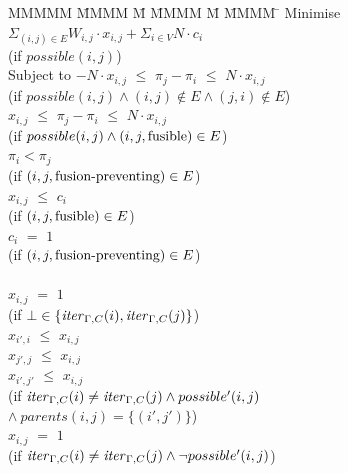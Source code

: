 \begin{tabbing}
MMMMM   \= MMMM \= M \= MMMM \= M \= MMMM \= \kill
Minimise   \> $\Sigma_{(i,j) \in E} W_{i,j} \cdot x_{i,j} + \Sigma_{i \in V} N \cdot c_i$  \\
           \> (if $possible(i,j)$)         
\\[1ex]
Subject to \> $-N \cdot x_{i,j}$ \> $\le$ \> $\pi_j - \pi_i$ \> $\le$ \> $N \cdot x_{i,j}$ \\
           \> (if $possible(i,j) \wedge (i,j) \not\in E \wedge (j,i) \not\in E$)            
\\[1ex]
           \>    $x_{i,j}$ \> $\le$ \> $\pi_j - \pi_i$ \> $\le$ \> $N \cdot x_{i,j}$ \\
           \> (if $possible(i,j) \wedge (i,j,\mathrm{fusible}) \in E$)     
\\[1ex]
           \>             \>       \> $\pi_i < \pi_j$ \>       \>            \\
           \> (if $(i,j,\mbox{fusion-preventing}) \in E$)    
\\[1ex]
           \> $x_{i,j}$    \> $\le$ \> $c_i$           \>       \>            \\
           \> (if $(i,j, \mathrm{fusible}) \in E$) \\
           \> $c_{i }$    \> $ = $ \> $ 1 $           \>       \>            \\
           \> (if $(i,j, \mbox{fusion-preventing}) \in E$) \\
\\[1ex]
           \> $x_{i,j}$    \> $=$   \> $1$             \>       \>            \\
           \> (if $\bot \in \{\mathit{iter}_{\Gamma,C}(i), \mathit{iter}_{\Gamma,C}(j)\}$)  
\\[1ex]
           \> $x_{i',i}$   \> $\le$ \> $x_{i,j}$        \>       \>            \\
           \> $x_{j',j}$   \> $\le$ \> $x_{i,j}$        \>       \>            \\
           \> $x_{i',j'}$   \> $\le$ \> $x_{i,j}$        \>       \>            \\
           \> (if $\mathit{iter}_{\Gamma,C}(i) \not= \mathit{iter}_{\Gamma,C}(j) \wedge possible'(i,j)$ \\
           \> \> $\wedge~parents(i,j) = \{(i',j')\}$) 
\\[1ex]
           \> $x_{i,j}$    \> $=$   \> $1$             \>       \>            \\
           \> (if $\mathit{iter}_{\Gamma,C}(i) \not= \mathit{iter}_{\Gamma,C}(j) \wedge \neg possible'(i,j)$) 

\end{tabbing}
